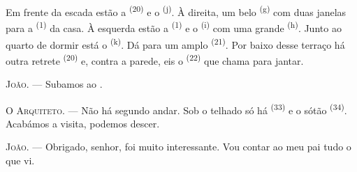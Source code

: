 \VUsaut{3.0mm}
\VUsaut{3.0mm}

Em frente da escada estão a  \textsuperscript{(20)} e o
 \textsuperscript{(j)}. À direita, um belo  \textsuperscript{(g)} com duas janelas para a 
\textsuperscript{(1)} da casa. À esquerda estão a 
\textsuperscript{(1)} e o  \textsuperscript{(i)} com uma
grande  \textsuperscript{(h)}. Junto ao quarto de dormir está o
 \textsuperscript{(k)}. Dá para um amplo
 \textsuperscript{(21)}. Por baixo desse terraço há outra
retrete \textsuperscript{(20)} e, contra a parede, eis o 
\textsuperscript{(22)} que chama para jantar.

\textsc{João}. --- Subamos ao .

\textsc{O Arquiteto}. --- Não há segundo andar. Sob o telhado só há
 \textsuperscript{(33)} e o sótão \textsuperscript{(34)}.
Acabámos a visita, podemos descer.

\textsc{João}. --- Obrigado, senhor, foi muito interessante. Vou contar ao
meu pai tudo o que vi.
\VUsaut{4.0mm}
\VUfilet{22mm}
